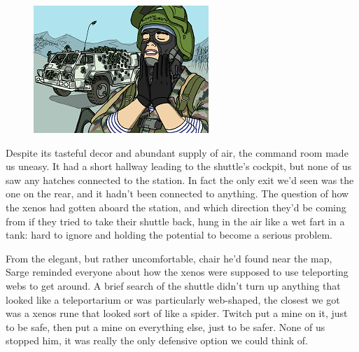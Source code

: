 \begin{figure}
	\begin{center}
		\includegraphics[width=\figwidth]{pics/11/56.png}
	\end{center}
\end{figure}
Despite its tasteful decor and abundant supply of air, the command room made us uneasy. 
It had a short hallway leading to the shuttle's cockpit, but none of us saw any hatches connected to the station. 
In fact the only exit we'd seen was the one on the rear, and it hadn't been connected to anything. 
The question of how the xenos had gotten aboard the station, and which direction they'd be coming from if they tried to take their shuttle back, hung in the air like a wet fart in a tank: 
hard to ignore and holding the potential to become a serious problem.

From the elegant, but rather uncomfortable, chair he'd found near the map, Sarge reminded everyone about how the xenos were supposed to use teleporting webs to get around. 
A brief search of the shuttle didn't turn up anything that looked like a teleportarium or was particularly web-shaped, the closest we got was a xenos rune that looked sort of like a spider. 
Twitch put a mine on it, just to be safe, then put a mine on everything else, just to be safer. 
None of us stopped him, it was really the only defensive option we could think of.

